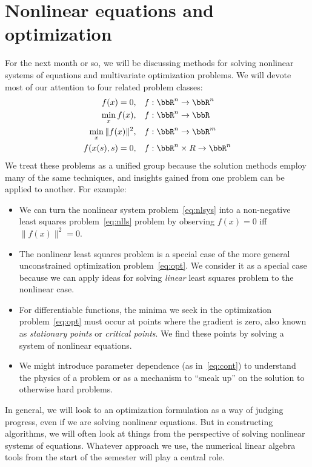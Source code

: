 \documentclass[12pt, leqno]{article} %
\begin{document}

\section*{Nonlinear equations and optimization}

For the next month or so, we will be discussing methods for solving
nonlinear systems of equations and multivariate optimization problems.
We will devote most of our attention to four related problem classes:
\begin{align}
  f(x) = 0, & \quad f : \bbR^n \rightarrow \bbR^n \label{eq:nlsys} \\
  \min_x f(x), & \quad f : \bbR^n \rightarrow \bbR \label{eq:opt} \\
  \min_x \|f(x)\|^2, & \quad f : \bbR^n \rightarrow \bbR^m \label{eq:nlls} \\
  f(x(s),s) = 0, & \quad f : \bbR^n \times R \rightarrow \bbR^n
  \label{eq:cont}
\end{align}
We treat these problems as a unified group because the solution
methods employ many of the same techniques, and insights gained from
one problem can be applied to another.  For example:
\begin{itemize}
\item
  We can turn the nonlinear system problem~\eqref{eq:nlsys} into
  a non-negative least squares problem~\eqref{eq:nlls} problem by
  observing $f(x) = 0$ iff $\|f(x)\|^2 = 0$.
\item
  The nonlinear least squares problem is a special case of the more
  general unconstrained optimization problem~\eqref{eq:opt}.  We
  consider it as a special case because we can apply ideas for solving
  {\em linear} least squares problem to the nonlinear case.
\item
  For differentiable functions, the minima we seek in the optimization
  problem~\eqref{eq:opt} must occur at points where the gradient is
  zero, also known as {\em stationary points} or {\em critical points}.
  We find these points by solving a system of nonlinear equations.
\item
  We might introduce parameter dependence (as in~\eqref{eq:cont})
  to understand the physics of a problem or as a mechanism to
  ``sneak up'' on the solution to otherwise hard problems.
\end{itemize}
In general, we will look to an optimization formulation as a way
of judging progress, even if we are solving nonlinear equations.
But in constructing algorithms, we will often look at things from
the perspective of solving nonlinear systems of equations.  Whatever
approach we use, the numerical linear algebra tools from the start
of the semester will play a central role.
\end{document}
